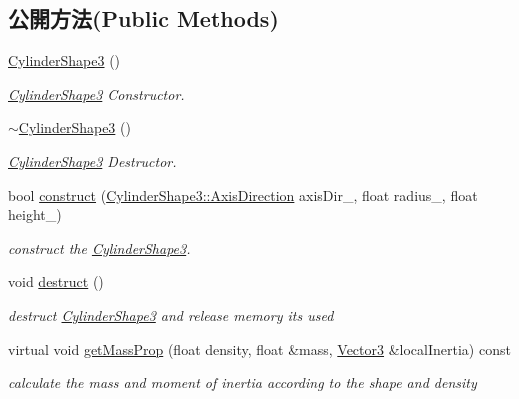 \subsection*{公開方法(Public Methods)}
\begin{DoxyCompactItemize}
\item 
\hyperlink{class_i_dream_sky_1_1_cylinder_shape3_a32c651f4bb77e70ddf6c2728b1b84bd8}{Cylinder\+Shape3} ()
\begin{DoxyCompactList}\small\item\em \hyperlink{class_i_dream_sky_1_1_cylinder_shape3}{Cylinder\+Shape3} Constructor. \end{DoxyCompactList}\item 
\hyperlink{class_i_dream_sky_1_1_cylinder_shape3_a71e40d19f4a4069fdc7dba140bd661e2}{$\sim$\+Cylinder\+Shape3} ()
\begin{DoxyCompactList}\small\item\em \hyperlink{class_i_dream_sky_1_1_cylinder_shape3}{Cylinder\+Shape3} Destructor. \end{DoxyCompactList}\item 
bool \hyperlink{class_i_dream_sky_1_1_cylinder_shape3_a32cf0f886433891007464cb5ff6e4fd4}{construct} (\hyperlink{class_i_dream_sky_1_1_cylinder_shape3_ad077fbb709c7e56e615ce7349be523e4}{Cylinder\+Shape3\+::\+Axis\+Direction} axis\+Dir\+\_\+, float radius\+\_\+, float height\+\_\+)
\begin{DoxyCompactList}\small\item\em construct the \hyperlink{class_i_dream_sky_1_1_cylinder_shape3}{Cylinder\+Shape3}. \end{DoxyCompactList}\item 
void \hyperlink{class_i_dream_sky_1_1_cylinder_shape3_a9166cef1017d172e8769a9d54e947660}{destruct} ()\hypertarget{class_i_dream_sky_1_1_cylinder_shape3_a9166cef1017d172e8769a9d54e947660}{}\label{class_i_dream_sky_1_1_cylinder_shape3_a9166cef1017d172e8769a9d54e947660}

\begin{DoxyCompactList}\small\item\em destruct \hyperlink{class_i_dream_sky_1_1_cylinder_shape3}{Cylinder\+Shape3} and release memory its used \end{DoxyCompactList}\item 
virtual void \hyperlink{class_i_dream_sky_1_1_cylinder_shape3_ac34f1b50e44652be4bb1752c0fe8bff9}{get\+Mass\+Prop} (float density, float \&mass, \hyperlink{class_i_dream_sky_1_1_vector3}{Vector3} \&local\+Inertia) const 
\begin{DoxyCompactList}\small\item\em calculate the mass and moment of inertia according to the shape and density \end{DoxyCompactList}\end{DoxyCompactItemize}
